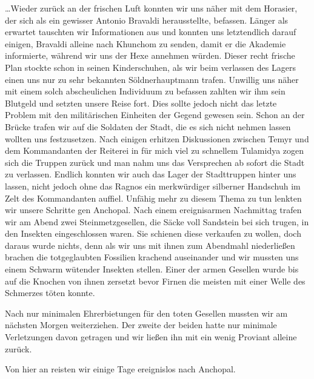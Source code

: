 \dots Wieder zurück an der frischen Luft konnten wir uns näher mit dem Horasier, der sich als ein gewisser Antonio Bravaldi herausstellte, befassen. Länger als erwartet tauschten wir Informationen aus und konnten uns letztendlich darauf einigen, Bravaldi alleine nach Khunchom zu senden, damit er die Akademie informierte, während wir uns der Hexe annehmen würden. Dieser recht frische Plan stockte schon in seinen Kinderschuhen, als wir beim verlassen des Lagers einen uns nur zu sehr bekannten Söldnerhauptmann trafen. Unwillig uns näher mit einem solch abscheulichen Individuum zu befassen zahlten wir ihm sein Blutgeld und setzten unsere Reise fort. Dies sollte jedoch nicht das letzte Problem mit den militärischen Einheiten der Gegend gewesen sein. Schon an der Brücke trafen wir auf die Soldaten der Stadt, die es sich nicht nehmen lassen wollten uns festzusetzen. Nach einigen erhitzen Diskussionen zwischen Temyr und dem Kommandanten der Reiterei in für mich viel zu schnellem Tulamidya zogen sich die Truppen zurück und man nahm uns das Versprechen ab sofort die Stadt zu verlassen. Endlich konnten wir auch das Lager der Stadttruppen hinter uns lassen, nicht jedoch ohne das Ragnos ein merkwürdiger silberner Handschuh im Zelt des Kommandanten auffiel. Unfähig mehr zu diesem Thema zu tun lenkten wir unsere Schritte gen Anchopal. Nach einem ereignisarmen Nachmittag trafen wir am Abend zwei Steinmetzgesellen, die Säcke voll Sandstein bei sich trugen, in den Insekten eingeschlossen waren. Sie schienen diese verkaufen zu wollen, doch daraus wurde nichts, denn als wir uns mit ihnen zum Abendmahl niederließen brachen die totgeglaubten Fossilien krachend auseinander und wir mussten uns einem Schwarm wütender Insekten stellen. Einer der armen Gesellen wurde bis auf die Knochen von ihnen zersetzt bevor Firnen die meisten mit einer Welle des Schmerzes töten konnte.

Nach nur minimalen Ehrerbietungen für den toten Gesellen mussten wir am nächsten Morgen weiterziehen. Der zweite der beiden hatte nur minimale Verletzungen davon getragen und wir ließen ihn mit ein wenig Proviant alleine zurück.

Von hier an reisten wir einige Tage ereignislos nach Anchopal.

